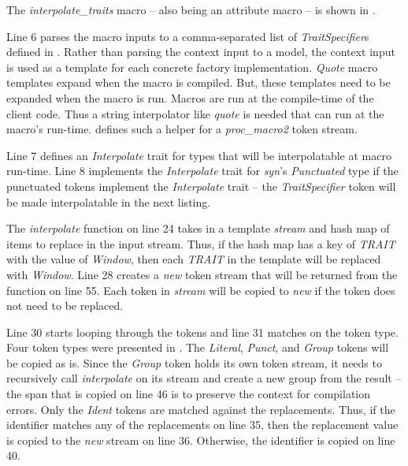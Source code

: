 
The \textit{interpolate\_traits} macro -- also being an attribute macro -- is shown in .


Line 6 parses the macro inputs to a comma-separated list of \textit{TraitSpecifier}s defined in .
Rather than parsing the context input to a model, the context input is used as a template for each concrete factory implementation.
\textit{Quote} macro templates expand when the macro is compiled.
But, these templates need to be expanded when the macro is run.
Macros are run at the compile-time of the client code.
Thus a string interpolator like \textit{quote} is needed that can run at the macro's run-time.
 defines such a helper for a \textit{proc\_macro2} token stream.


Line 7 defines an \textit{Interpolate} trait for types that will be interpolatable at macro run-time.
Line 8 implements the \textit{Interpolate} trait for \textit{syn}'s \textit{Punctuated} type if the punctuated tokens implement the \textit{Interpolate} trait -- the \textit{TraitSpecifier} token will be made interpolatable in the next listing.

The \textit{interpolate} function on line 24 takes in a template \textit{stream} and hash map of items to replace in the input stream.
Thus, if the hash map has a key of \textit{TRAIT} with the value of \textit{Window}, then each \textit{TRAIT} in the template will be replaced with \textit{Window}.
Line 28 creates a \textit{new} token stream that will be returned from the function on line 55.
Each token in \textit{stream} will be copied to \textit{new} if the token does not need to be replaced.

Line 30 starts looping through the tokens and line 31 matches on the token type.
Four token types were presented in .
The \textit{Literal}, \textit{Punct}, and \textit{Group} tokens will be copied as is.
Since the \textit{Group} token holds its own token stream, it needs to recursively call \textit{interpolate} on its stream and create a new group from the result -- the span that is copied on line 46 is to preserve the context for compilation errors.
Only the \textit{Ident} tokens are matched against the replacements.
Thus, if the identifier matches any of the replacements on line 35, then the replacement value is copied to the \textit{new} stream on line 36.
Otherwise, the identifier is copied on line 40.


